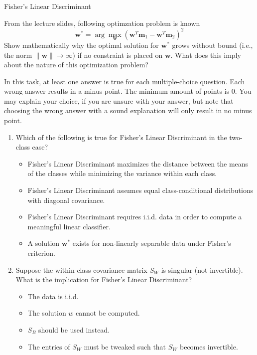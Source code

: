\documentclass[
	english,
        solution=true
	]{tudaexercise}
\begin{document}
\begin{task}[points=6]{Fisher's Linear Discriminant}
\begin{subtask}[points=3]{}
From the lecture slides, following optimzation problem is known
\[
\mathbf{w}^* = \arg\max_{\mathbf{w}} \left( \mathbf{w}^T \mathbf{m}_1 - \mathbf{w}^T \mathbf{m}_2 \right)^2
\]
Show mathematically why the optimal solution for \( \mathbf{w}^* \) grows without bound (i.e., the norm \( \|\mathbf{w}\| \to \infty \)) if no constraint is placed on \( \mathbf{w} \). What does this imply about the nature of this optimization problem?
\end{subtask}
\begin{solution}

\end{solution}

\begin{subtask}[points=3]{}
In this task, at least one answer is true for each multiple-choice question. Each wrong answer results in a minus point. The minimum amount of points is 0. You may explain your choice, if you are unsure with your answer, but note that choosing the wrong answer with a sound explanation will only result in no minus point.

\begin{enumerate}
\item Which of the following is true for Fisher's Linear Discriminant in the two-class case?

\begin{itemize}[label=\Square]
    \item Fisher's Linear Discriminant maximizes the distance between the means of the classes while minimizing the variance within each class.
    \item Fisher's Linear Discriminant assumes equal class-conditional distributions with diagonal covariance.
    \item Fisher's Linear Discriminant requires i.i.d. data in order to compute a meaningful linear classifier.
    \item A solution $\mathbf{w}^*$ exists for non-linearly separable data under Fisher's criterion.
\end{itemize}

\item Suppose the within-class covariance matrix $S_W$ is singular (not invertible). What is the implication for Fisher’s Linear Discriminant?
\begin{itemize}[label=\Square]
    \item The data is i.i.d.
    \item The solution $w$ cannot be computed.
    \item $S_B$ should be used instead.
    \item The entries of $S_W$ must be tweaked such that $S_W$ becomes invertible.
\end{itemize}
\end{enumerate}


\end{subtask}
\end{task}
\end{document}
